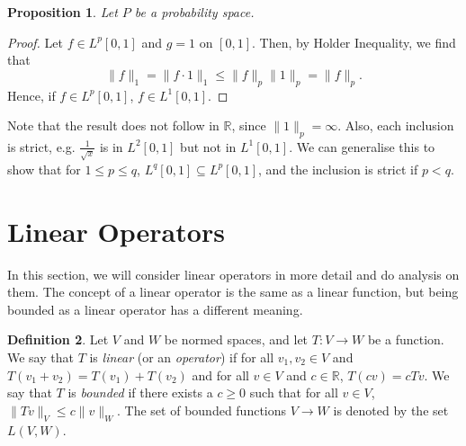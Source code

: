 \documentclass[a4paper, openany]{memoir}
\theoremstyle{definition}
\newtheorem{definition}{Definition}[section]
\theoremstyle{plain}
\newtheorem{proposition}[definition]{Proposition}
\begin{document}
    \begin{proposition}
        Let $P$ be a probability space.
    \end{proposition}
    \begin{proof}
        Let $f \in L^p[0, 1]$ and $g = 1$ on $[0, 1]$. Then, by Holder Inequality, we find that 
        \[\lVert f \rVert_1 = \lVert f \cdot 1 \rVert_1 \leq \lVert f \rVert_p \lVert 1 \rVert_p = \lVert f \rVert_p.\]
        Hence, if $f \in L^p[0, 1]$, $f \in L^1[0, 1]$.
    \end{proof}
    \noindent Note that the result does not follow in $\mathbb{R}$, since $\lVert 1 \rVert_p = \infty$. Also, each inclusion is strict, e.g. $\frac{1}{\sqrt{x}}$ is in $L^2[0, 1]$ but not in $L^1[0, 1]$. We can generalise this to show that for $1 \leq p \leq q$, $L^q[0, 1] \subseteq L^p[0, 1]$, and the inclusion is strict if $p < q$.
    \newpage

    \section{Linear Operators}
    In this section, we will consider linear operators in more detail and do analysis on them. The concept of a linear operator is the same as a linear function, but being bounded as a linear operator has a different meaning.
    \begin{definition}
        Let $V$ and $W$ be normed spaces, and let $T \colon V \to W$ be a function. We say that $T$ is \emph{linear} (or an \emph{operator}) if for all $v_1, v_2 \in V$ and $T(v_1 + v_2) = T(v_1) + T(v_2)$ and for all $v \in V$ and $c \in \mathbb{R}$, $T(cv) = cTv$. We say that $T$ is \emph{bounded} if there exists a $c \geq 0$ such that for all $v \in V$, $\lVert Tv \rVert_V \leq c\lVert v \rVert_W$. The set of bounded functions $V \to W$ is denoted by the set $L(V, W)$.
    \end{definition}
\end{document}
